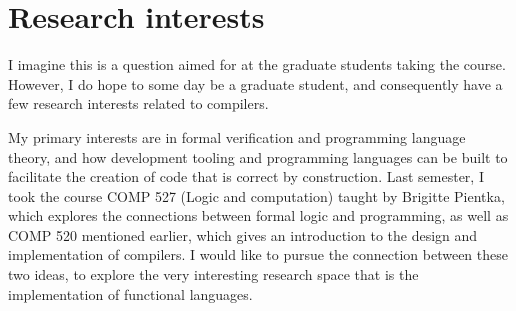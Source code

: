 \documentclass[letterpaper,11pt]{article}
\begin{document}
\section{Research interests}

I imagine this is a question aimed for at the graduate students taking the
course. However, I do hope to some day be a graduate student, and consequently
have a few research interests related to compilers.

My primary interests are in formal verification and programming language
theory, and how development tooling and programming languages can be built to
facilitate the creation of code that is correct by construction. Last semester,
I took the course COMP 527 (Logic and computation) taught by Brigitte Pientka,
which explores the connections between formal logic and programming, as well as
COMP 520 mentioned earlier, which gives an introduction to the design and
implementation of compilers. I would like to pursue the connection between
these two ideas, to explore the very interesting research space that is the
implementation of functional languages.
\end{document}
